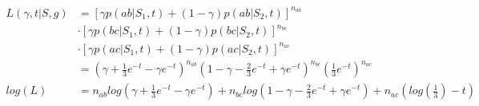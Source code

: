 \documentclass[11pt,a4paper]{report}
\begin{document}
\begin{align*}
L(\gamma,t|S,g) &= [\gamma{}p(ab|S_1,t) + (1-\gamma)p(ab|S_2,t)]^{n_{ab}}\\
		& \cdot [\gamma{}p(bc|S_1,t) + (1-\gamma)p(bc|S_2,t)]^{n_{bc}}\\
		& \cdot [\gamma{}p(ac|S_1,t) + (1-\gamma)p(ac|S_2,t)]^{n_{ac}}\\
 &= (\gamma + \frac{1}{3}e^{-t} - \gamma{}e^{-t})^{n_{ab}}
	(1-\gamma-\frac{2}{3}e^{-t} + \gamma{}e^{-t})^{n_{bc}}
	(\frac{1}{3}e^{-t})^{n_{ac}}\\
log(L) &= n_{ab}log(\gamma + \frac{1}{3}e^{-t} - \gamma{}e^{-t})
	+ n_{bc}log(1-\gamma-\frac{2}{3}e^{-t} + \gamma{}e^{-t})
	+ n_{ac}(log(\frac{1}{3}) -t)
\end{align*}

\pagebreak


\end{document}
